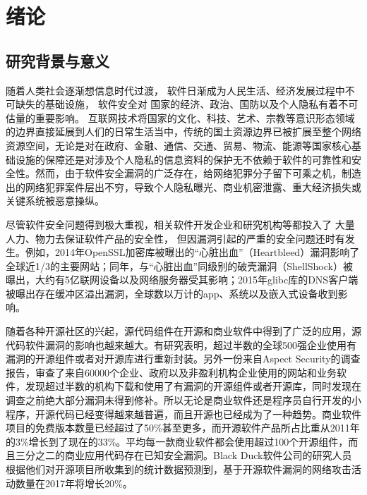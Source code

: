 \chapter{绪论}
\section{研究背景与意义}
随着人类社会逐渐想信息时代过渡， %
软件日渐成为人民生活、经济发展过程中不可缺失的基础设施， %
软件安全对
国家的经济、政治、国防以及个人隐私有着不可估量的重要影响。
互联网技术将国家的文化、科技、艺术、宗教等意识形态领域的边界直接延展到人们的日常生活当中，传统的国土资源边界已被扩展至整个网络资源空间，无论是对在政府、金融、通信、交通、贸易、物流、能源等国家核心基础设施的保障还是对涉及个人隐私的信息资料的保护无不依赖于软件的可靠性和安全性。然而，由于软件安全漏洞的广泛存在，给网络犯罪分子留下可乘之机，制造出的网络犯罪案件层出不穷，导致个人隐私曝光、商业机密泄露、重大经济损失或关键系统被恶意操纵。


尽管软件安全问题得到极大重视，相关软件开发企业和研究机构等都投入了
大量人力、物力去保证软件产品的安全性，
但因漏洞引起的严重的安全问题还时有发生。例如，2014年OpenSSL加密库被曝出的“心脏出血”（Heartbleed）漏洞影响了全球近1/3的主要网站；同年，与“心脏出血”同级别的破壳漏洞（ShellShock）被曝出，大约有5亿联网设备以及网络服务器受其影响；2015年glibc库的DNS客户端被曝出存在缓冲区溢出漏洞，全球数以万计的app、系统以及嵌入式设备收到影响。

随着各种开源社区的兴起，源代码组件在开源和商业软件中得到了广泛的应用，源代码软件漏洞的影响也越来越大。有研究表明，超过半数的全球500强企业使用有漏洞的开源组件或者对开源库进行重新封装。另外一份来自Aspect Security的调查报告，审查了来自60000个企业、政府以及非盈利机构企业使用的网站和业务软件，发现超过半数的机构下载和使用了有漏洞的开源组件或者开源库，同时发现在调查之前绝大部分漏洞未得到修补。所以无论是商业软件还是程序员自行开发的小程序，开源代码已经变得越来越普遍，而且开源也已经成为了一种趋势。商业软件项目的免费版本数量已经超过了50\%甚至更多，而开源软件产品所占比重从2011年的3\%增长到了现在的33\%。平均每一款商业软件都会使用超过100个开源组件，而且三分之二的商业应用代码存在已知安全漏洞。Black Duck软件公司的研究人员根据他们对开源项目所收集到的统计数据预测到，基于开源软件漏洞的网络攻击活动数量在2017年将增长20\%。

